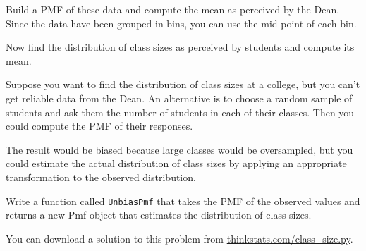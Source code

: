 \documentclass[12pt]{book}
\begin{document}
\begin{exercise}
Build a PMF of these data and compute the mean as perceived by the
Dean.  Since the data have been grouped in bins, you can use the
mid-point of each bin.

Now find the distribution of class sizes as perceived by students
and compute its mean.  

Suppose you want to find the distribution of class sizes at a
college, but you can't get reliable data from the Dean.
An alternative is to choose a random sample of students and ask them
the number of students in each of their classes.  Then you could compute
the PMF of their responses.

The result would be biased because large classes
would be oversampled, but you could estimate the actual
distribution of class sizes by applying an appropriate transformation
to the observed distribution.

Write a function called \verb"UnbiasPmf" that takes the PMF of the
observed values and returns a new Pmf object that estimates the
distribution of class sizes.

You can download a solution to this problem from
\url{thinkstats.com/class_size.py}.

\end{exercise}
\end{document}
